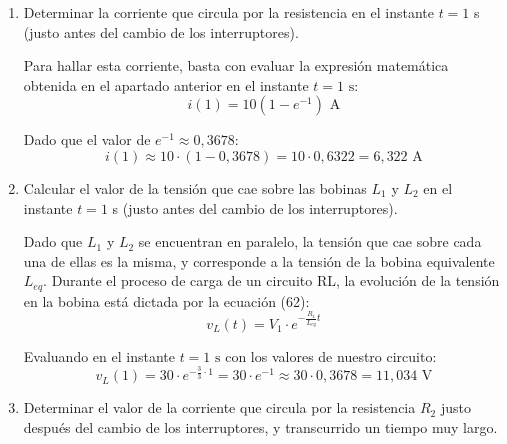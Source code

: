 \documentclass[11pt, a4paper]{article}
\newenvironment{problem}[1][Cuestión]{
		\vspace{0.5cm}
		\noindent{\Large\bfseries #1} \par\vspace{0.5cm}
}{
		\vspace{0.5cm}
}
\begin{document}
\begin{problem}[Cuestión 3]
\begin{enumerate}[label=\alph*)]
				{ \color{blue} 
					Al cerrar el interruptor A (y con B abierto), la fuente $V_1$, la resistencia $R_1$ y la bobina equivalente $L_{eq}$ quedan conectadas en serie, formando un circuito RL en proceso de carga.

					La expresión de la intensidad para un circuito RL en carga viene dada por la ecuación (60):
					$$i(t) = \frac{V_1}{R_1} \left(1 - e^{-\frac{R_1}{L_{eq}}t}\right)$$

					Donde la constante de tiempo $\tau$ se define en la ecuación (66) como $\tau = \frac{L_{eq}}{R_1}$. 

					Sustituyendo nuestros valores ($V_1 = 30 \text{ V}$, $R_1 = 3 \; \Omega$ y $L_{eq} = 3 \text{ H}$), obtenemos:
					$$\boxed{i(t) = \frac{30}{3} \left(1 - e^{-\frac{3}{3}t}\right) = 10 \left(1 - e^{-t}\right) \text{ A}}$$
				}

			\item Determinar la corriente que circula por la resistencia en el instante $t=1$ s (justo antes del cambio de los interruptores).

				{ \color{blue} 
					Para hallar esta corriente, basta con evaluar la expresión matemática obtenida en el apartado anterior en el instante $t = 1 \text{ s}$:
					$$i(1) = 10 \left(1 - e^{-1}\right) \text{ A}$$

					Dado que el valor de $e^{-1} \approx 0,3678$:
					$$\boxed{i(1) \approx 10 \cdot (1 - 0,3678) = 10 \cdot 0,6322 = 6,322 \text{ A}}$$
				}

			\item Calcular el valor de la tensión que cae sobre las bobinas $L_1$ y $L_2$ en el instante $t = 1$ s (justo antes del cambio de los interruptores).

				{ \color{blue} 
					Dado que $L_1$ y $L_2$ se encuentran en paralelo, la tensión que cae sobre cada una de ellas es la misma, y corresponde a la tensión de la bobina equivalente $L_{eq}$. Durante el proceso de carga de un circuito RL, la evolución de la tensión en la bobina está dictada por la ecuación (62):
					$$v_L(t) = V_1 \cdot e^{-\frac{R_1}{L_{eq}}t}$$

					Evaluando en el instante $t=1 \text{ s}$ con los valores de nuestro circuito:
					$$\boxed{v_L(1) = 30 \cdot e^{-\frac{3}{3}\cdot 1} = 30 \cdot e^{-1} \approx 30 \cdot 0,3678 = 11,034 \text{ V}}$$
				}

			\item Determinar el valor de la corriente que circula por la resistencia $R_2$ justo después del cambio de los interruptores, y transcurrido un tiempo muy largo.


\end{enumerate}
\end{problem}
\end{document}

